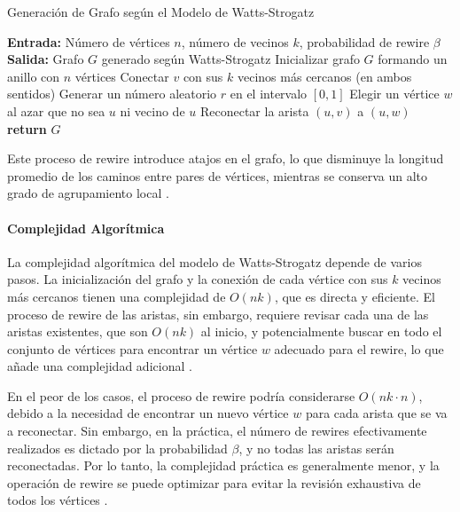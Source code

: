 \begin{algorithm}
\caption{Generación de Grafo según el Modelo de Watts-Strogatz}
\begin{algorithmic}[1]
\State \textbf{Entrada:} Número de vértices $n$, número de vecinos $k$, probabilidad de rewire $\beta$
\State \textbf{Salida:} Grafo $G$ generado según Watts-Strogatz
    \State Inicializar grafo $G$ formando un anillo con $n$ vértices
        \State Conectar $v$ con sus $k$ vecinos más cercanos (en ambos sentidos)
    \EndFor
        \State Generar un número aleatorio $r$ en el intervalo $[0, 1]$
            \State Elegir un vértice $w$ al azar que no sea $u$ ni vecino de $u$
            \State Reconectar la arista $(u, v)$ a $(u, w)$
        \EndIf
    \EndFor
    \State \textbf{return} $G$
\EndProcedure
\end{algorithmic}
\end{algorithm}

Este proceso de rewire introduce atajos en el grafo, lo que disminuye la longitud promedio de los caminos entre pares de vértices, mientras se conserva un alto grado de agrupamiento local .

\paragraph{Complejidad Algorítmica}

La complejidad algorítmica del modelo de Watts-Strogatz depende de varios pasos. La inicialización del grafo y la conexión de cada vértice con sus $k$ vecinos más cercanos tienen una complejidad de $O(nk)$, que es directa y eficiente. El proceso de rewire de las aristas, sin embargo, requiere revisar cada una de las aristas existentes, que son $O(nk)$ al inicio, y potencialmente buscar en todo el conjunto de vértices para encontrar un vértice $w$ adecuado para el rewire, lo que añade una complejidad adicional .

En el peor de los casos, el proceso de rewire podría considerarse $O(nk \cdot n)$, debido a la necesidad de encontrar un nuevo vértice $w$ para cada arista que se va a reconectar. Sin embargo, en la práctica, el número de rewires efectivamente realizados es dictado por la probabilidad $\beta$, y no todas las aristas serán reconectadas. Por lo tanto, la complejidad práctica es generalmente menor, y la operación de rewire se puede optimizar para evitar la revisión exhaustiva de todos los vértices .

